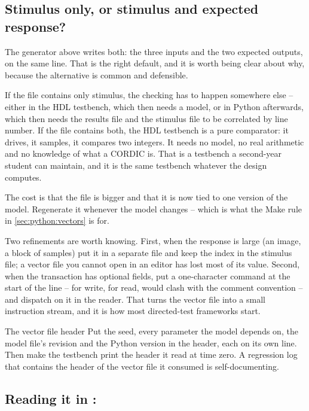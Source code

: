 \subsection{Stimulus only, or stimulus and expected response?}

The generator above writes both: the three inputs and the two expected
outputs, on the same line. That is the right default, and it is worth being
clear about why, because the alternative is common and defensible.

If the file contains only stimulus, the checking has to happen somewhere
else -- either in the HDL testbench, which then needs a model, or in Python
afterwards, which then needs the results file and the stimulus file to be
correlated by line number. If the file contains both, the HDL testbench is a
pure comparator: it drives, it samples, it compares two integers. It needs no
model, no real arithmetic and no knowledge of what a CORDIC is. That is a
testbench a second-year student can maintain, and it is the same testbench
whatever the design computes.

The cost is that the file is bigger and that it is now tied to one version of
the model. Regenerate it whenever the model changes -- which is what the Make
rule in \cref{sec:python:vectors} is for.

Two refinements are worth knowing. First, when the response is large
(an image, a block of samples) put it in a separate file and keep the index
in the stimulus file; a vector file you cannot open in an editor has lost
most of its value. Second, when the transaction has optional fields, put a
one-character command at the start of the line --  for write,
 for read, \code{\#} would clash with the comment convention -- and
dispatch on it in the reader. That turns the vector file into a small
instruction stream, and it is how most directed-test frameworks start.

\begin{tipbox}{The vector file header}
Put the seed, every parameter the model depends on, the model file's revision
and the Python version in the header, each on its own \code{//} line. Then
make the testbench print the header it read at time zero. A regression log
that contains the header of the vector file it consumed is self-documenting.
\end{tipbox}

\subsection{Reading it in \SV{}: }

